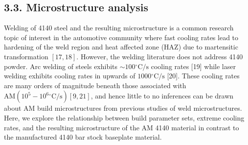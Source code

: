 \documentclass[10pt]{article}
\begin{document}
\subsection*{3.3. Microstructure analysis}
Welding of 4140 steel and the resulting microstructure is a common research topic of interest in the automotive community where fast cooling rates lead to hardening of the weld region and heat affected zone (HAZ) due to martensitic transformation $[17,18]$. However, the welding literature does not address 4140 powder. Arc welding of steels exhibits $\sim 100{ }^{\circ} \mathrm{C} / \mathrm{s}$ cooling rates [19] while laser welding exhibits cooling rates in upwards of $1000{ }^{\circ} \mathrm{C} / \mathrm{s}$ [20]. These cooling rates are many orders of magnitude beneath those associated with $\mathrm{AM}\left(10^{5}-10^{6}{ }^{\circ} \mathrm{C} / \mathrm{s}\right)[9,21]$, and hence little to no inferences can be drawn about AM build microstructures from previous studies of weld microstructures. Here, we explore the relationship between build parameter sets, extreme cooling rates, and the resulting microstructure of the AM 4140 material in contrast to the manufactured 4140 bar stock baseplate material.
\end{document}
